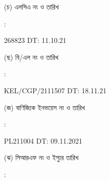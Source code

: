 \documentclass[12pt]{article}
\newcommand{\blno}{KEL/CGP/2111507}
\newcommand{\bldt}{18.11.21}
\newcommand{\lcdt}{11.10.21}
\newcommand{\lcano}{268823}
\newcommand{\lcadt}{\lcdt}
\newcommand{\invno}{PL211004}
\newcommand{\invdt}{09.11.2021}
\begin{document}
\begin{minipage}[t]{0.05\linewidth}
\hspace*{1em}
\end{minipage}
\begin{minipage}[t]{0.40\linewidth}
(চ) এলসিএ নং ও তারিখ
\end{minipage}
\begin{minipage}[t]{0.02\linewidth}
:
\end{minipage}
\begin{minipage}[t]{0.53\linewidth}
{\lcano} \hspace{2em} DT: {\lcadt}
\\
\end{minipage}
\begin{minipage}[t]{0.05\linewidth}
\hspace*{1em}
\end{minipage}
\begin{minipage}[t]{0.40\linewidth}
(ছ) বি/এল নং ও তারিখ
\end{minipage}
\begin{minipage}[t]{0.02\linewidth}
:
\end{minipage}
\begin{minipage}[t]{0.53\linewidth}
{\blno} \hspace{2em} DT: {\bldt}
\\
\end{minipage}
\begin{minipage}[t]{0.05\linewidth}
\hspace*{1em}
\end{minipage}
\begin{minipage}[t]{0.40\linewidth}
(জ) বাণিজ্যিক ইনভয়েস নং ও তারিখ
\end{minipage}
\begin{minipage}[t]{0.02\linewidth}
:
\end{minipage}
\begin{minipage}[t]{0.53\linewidth}
{\invno} \hspace{2em} DT: {\invdt}
\\
\end{minipage}
\begin{minipage}[t]{0.05\linewidth}
\hspace*{1em}
\end{minipage}
\begin{minipage}[t]{0.40\linewidth}
(ঝ) সিআরএফ নং ও ইস্যুর তারিখ
\end{minipage}
\begin{minipage}[t]{0.02\linewidth}
:
\end{minipage}
\end{document}
